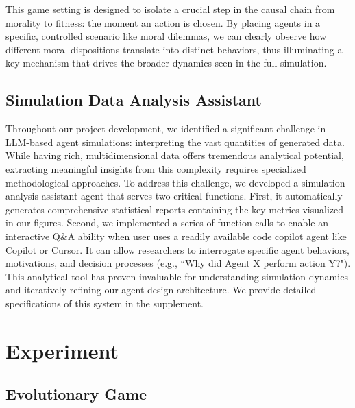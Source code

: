 \documentclass[letterpaper]{article} %
\begin{document}
This game setting is designed to isolate a crucial step in the causal chain from morality to fitness: the moment an action is chosen. By placing agents in a specific, controlled scenario like moral dilemmas, we can clearly observe how different moral dispositions translate into distinct behaviors, thus illuminating a key mechanism that drives the broader dynamics seen in the full simulation. 


\subsection{Simulation Data Analysis Assistant}

Throughout our project development, we identified a significant challenge in LLM-based agent simulations: interpreting the vast quantities of generated data. While having rich, multidimensional data offers tremendous analytical potential, extracting meaningful insights from this complexity requires specialized methodological approaches. To address this challenge, we developed a simulation analysis assistant agent that serves two critical functions. First, it automatically generates comprehensive statistical reports containing the key metrics visualized in our figures. Second, we implemented a series of function calls to enable an interactive Q\&A ability when user uses a readily available code copilot agent like Copilot or Cursor. It can allow researchers to interrogate specific agent behaviors, motivations, and decision processes (e.g., ``Why did Agent X perform action Y?"). This analytical tool has proven invaluable for understanding simulation dynamics and iteratively refining our agent design architecture. We provide detailed specifications of this system in the supplement.

\section{Experiment}

\subsection{Evolutionary Game}
\end{document}
